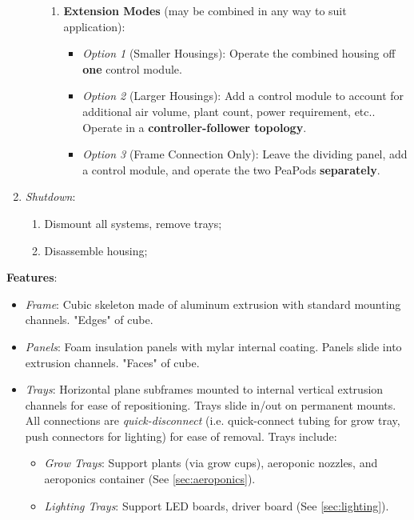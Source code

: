 \documentclass{report}
\begin{document}
\begin{enumerate}
\begin{enumerate}
\begin{enumerate}
            \item \textbf{Extension Modes} (may be combined in any way to suit application):
            \begin{itemize}
                \item \textit{Option 1} (Smaller Housings): Operate the combined housing off \textbf{one} control module.
                \item \textit{Option 2} (Larger Housings): Add a control module to account for additional air volume, plant count, power requirement, etc.. Operate in a \textbf{controller-follower topology}.
                \item \textit{Option 3} (Frame Connection Only): Leave the dividing panel, add a control module, and operate the two PeaPods \textbf{separately}.
            \end{itemize}
        \end{enumerate}
    \end{enumerate}
    \item \textit{Shutdown}:
    \begin{enumerate}
        \item Dismount all systems, remove trays;
        \item Disassemble housing;
    \end{enumerate}
\end{enumerate}

\newpage

\textbf{Features}:
\begin{itemize}
    \item \textit{Frame}: Cubic skeleton made of aluminum extrusion with standard mounting channels. "Edges" of cube.
    \item \textit{Panels}: Foam insulation panels with mylar internal coating. Panels slide into extrusion channels. "Faces" of cube.
    \item \textit{Trays}: Horizontal plane subframes mounted to internal vertical extrusion channels for ease of repositioning. Trays slide in/out on permanent mounts. All connections are \textit{quick-disconnect} (i.e. quick-connect tubing for grow tray, push connectors for lighting) for ease of removal. Trays include:
    \begin{itemize}
        \item \textit{Grow Trays}: Support plants (via grow cups), aeroponic nozzles, and aeroponics container (See \ref{sec:aeroponics}).
        \item \textit{Lighting Trays}: Support LED boards, driver board (See \ref{sec:lighting}).
    \end{itemize}
\end{itemize}
\end{document}
